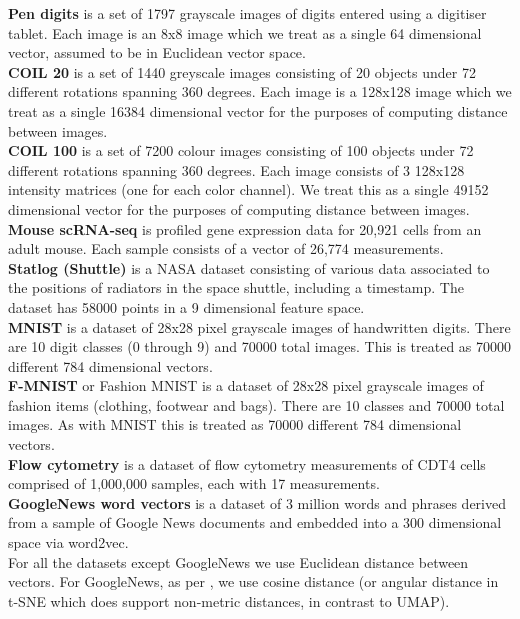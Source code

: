 \documentclass[12pt]{article}
\begin{document}
\noindent\textbf{Pen digits} \cite{alpaydin1998pen, sklearn_api} is a set of 1797 grayscale images of digits entered using a digitiser tablet. Each image is an 8x8 image which we treat as a single 64 dimensional vector, assumed to be in Euclidean vector space.
\\
\textbf{COIL 20} \cite{COIL20}
is a set of 1440 greyscale images consisting of 20 objects under 72 different rotations spanning 360 degrees.  Each image is a 128x128 image which we treat as a single 16384 dimensional vector for the purposes of computing distance between images. \\
\textbf{COIL 100} \cite{COIL100}
is a set of 7200 colour images consisting of 100 objects under 72 different rotations spanning 360 degrees.  Each image consists of 3 128x128 intensity matrices (one for each color channel).  We treat this as a single 49152 dimensional vector for the purposes of computing distance between images. \\
\textbf{Mouse scRNA-seq} \cite{campbell2017molecular} is profiled gene expression data for 20,921 cells from an adult mouse.  Each sample consists of a vector of 26,774 measurements.\\
\textbf{Statlog (Shuttle)} \cite{UCI} is a NASA dataset consisting of various data associated to the positions of radiators in the space shuttle, including a timestamp. The dataset has 58000 points in a 9 dimensional feature space. \\
\textbf{MNIST} \cite{mnistlecun} is a dataset of 28x28 pixel grayscale images of handwritten digits. There are 10 digit classes (0 through 9) and 70000 total images. This is treated as 70000 different 784 dimensional vectors.\\
\textbf{F-MNIST} \cite{xiao2017} or Fashion MNIST is a dataset of 28x28 pixel grayscale images of fashion items (clothing, footwear and bags). There are 10 classes and 70000 total images. As with MNIST this is treated as 70000 different 784 dimensional vectors.\\
\textbf{Flow cytometry} \cite{spidlen2012flowrepository, brodie2013omip} is a dataset of flow cytometry measurements of CDT4 cells comprised of 1,000,000 samples, each with 17 measurements.
\\
\textbf{GoogleNews word vectors} \cite{mikolov2013distributed}
is a dataset of 3 million words and phrases derived from a sample of Google News documents and embedded into a 300 dimensional space via word2vec.\\

For all the datasets except GoogleNews we use Euclidean distance between vectors. For GoogleNews, as per \cite{mikolov2013distributed}, we use cosine distance (or angular distance in t-SNE which does support non-metric distances, in contrast to UMAP).
\end{document}
